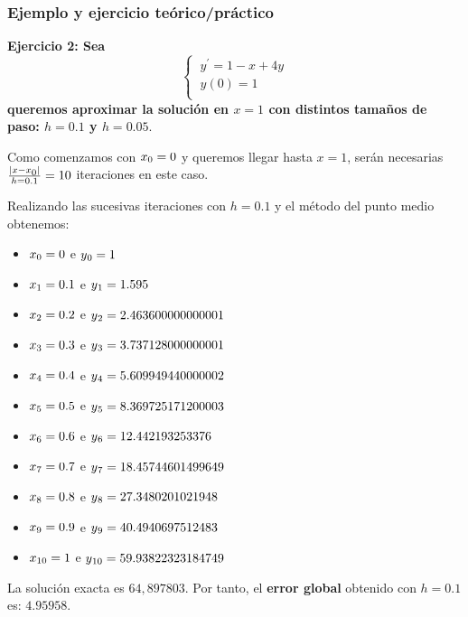 \documentclass[paper=a4, fontsize=11pt]{scrartcl} %
\numberwithin{equation}{section}
\begin{document}
	\subsubsection{Ejemplo y ejercicio teórico/práctico}
	\textbf{Ejercicio 2: Sea \begin{equation*}
		\left\lbrace
		\begin{array}{l}
		\ y^\prime = 1 - x + 4y \\
		\ y(0) = 1 \\
		\end{array}
		\right.
		\end{equation*} queremos aproximar la solución en $x=1$ con distintos tamaños de paso: $h=0.1$ y $h=0.05$}.
	
	Como comenzamos con $x\textsubscript{0} = 0$ y queremos llegar hasta $x = 1$, serán necesarias $\frac{|x - x\textsubscript{0}|}{h = 0.1} = 10$ iteraciones en este caso.
	
	Realizando las sucesivas iteraciones con $h = 0.1$ y el método del punto medio obtenemos:
	\begin{itemize}
		\item $x\textsubscript{0} = 0$ e $y\textsubscript{0} = 1$
		\item $x\textsubscript{1} = 0.1$ e $y\textsubscript{1} = 1.595$
		\item $x\textsubscript{2} = 0.2$ e $y\textsubscript{2} = 2.463600000000001$
		\item $x\textsubscript{3} = 0.3$ e $y\textsubscript{3} = 3.737128000000001$
		\item $x\textsubscript{4} = 0.4$ e $y\textsubscript{4} = 5.609949440000002$
		\item $x\textsubscript{5} = 0.5$ e $y\textsubscript{5} = 8.369725171200003$
		\item $x\textsubscript{6} = 0.6$ e $y\textsubscript{6} = 12.442193253376$
		\item $x\textsubscript{7} = 0.7$ e $y\textsubscript{7} = 18.45744601499649$
		\item $x\textsubscript{8} = 0.8$ e $y\textsubscript{8} = 27.3480201021948$
		\item $x\textsubscript{9} = 0.9$ e $y\textsubscript{9} = 40.4940697512483$
		\item $x\textsubscript{10} = 1$ e $y\textsubscript{10} = 59.93822323184749$
	\end{itemize}
	
	La solución exacta es $64,897803$. Por tanto, el \textbf{error global} obtenido con $h = 0.1$ es: $4.95958$.
	
\end{document}
